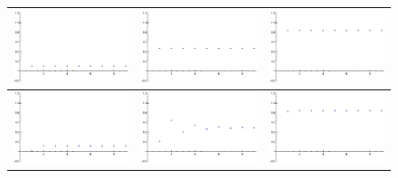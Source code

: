 \begin{figure}[h!]
\begin{center}
\begin{tabular}{c | c | c}
        \includegraphics[width=0.32\linewidth]{analytics/images/exactCorrFns/lowDensMidL}  & \includegraphics[width=0.32 \linewidth]{analytics/images/exactCorrFns/midDensMidL} & \includegraphics[width=0.32 \linewidth]{analytics/images/exactCorrFns/highDensMidL} \\
    \hline
        \includegraphics[width=0.32\linewidth]{analytics/images/exactCorrFns/lowDensHighL}  & \includegraphics[width=0.32 \linewidth]{analytics/images/exactCorrFns/midDensHighL} & \includegraphics[width=0.32 \linewidth]{analytics/images/exactCorrFns/highDensHighL} \\
    \end{tabular}
\end{center}
    \vspace{-2em}
\end{figure}

